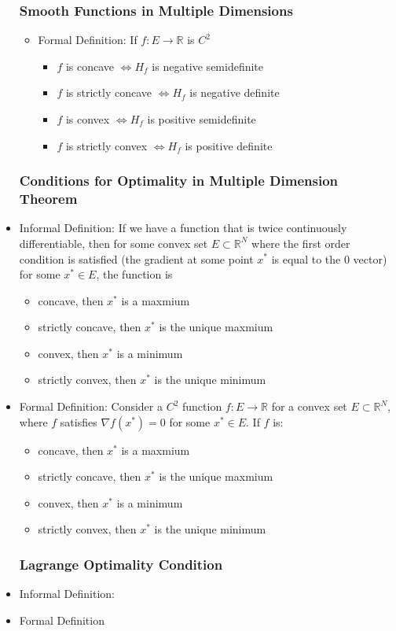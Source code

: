 \documentclass{article}
\begin{document}
\begin{itemize}
\subsubsection{Smooth Functions in Multiple Dimensions}
\begin{itemize}
    \item Formal Definition: If $ f : E \rightarrow \mathbb{R} $ is $ C^2 $
    \begin{itemize}
        \item $ f $ is concave $ \iff H_f $ is negative semidefinite
        \item $ f $ is strictly concave $ \iff H_f $ is negative definite
        \item $ f $ is convex $ \iff H_f $ is positive semidefinite
        \item $ f $ is strictly convex $ \iff H_f $ is positive definite 
    \end{itemize} 
\end{itemize}

\subsubsection{Conditions for Optimality in Multiple Dimension Theorem}
\item Informal Definition: If we have a function that is twice continuously 
differentiable, then for some convex set $ E \subset \mathbb{R}^N  $ where the 
first order condition is satisfied (the gradient at some point $ x^* $ is equal 
to the 0 vector) for some $ x^* \in E $, the function is
\begin{itemize}
    \item concave, then $ x^* $ is a maxmium
    \item strictly concave, then $ x^* $ is the unique maxmium
    \item convex, then $ x^* $ is a minimum
    \item strictly convex, then $ x^* $ is the unique minimum
\end{itemize} 
\item Formal Definition: Consider a $ C^2 $ function $ f : E \rightarrow  
\mathbb{R} $ for a convex set $ E \subset \mathbb{R}^N $, where $ f $ satisfies
$ \nabla f(x^*) = 0  $ for some $ x^* \in E $. If $ f
$ is:
\begin{itemize}
    \item concave, then $ x^* $ is a maxmium
    \item strictly concave, then $ x^* $ is the unique maxmium
    \item convex, then $ x^* $ is a minimum
    \item strictly convex, then $ x^* $ is the unique minimum
\end{itemize} 

\subsubsection{Lagrange Optimality Condition}
\item Informal Definition:
\item Formal Definition 

\end{itemize}
\end{document}
